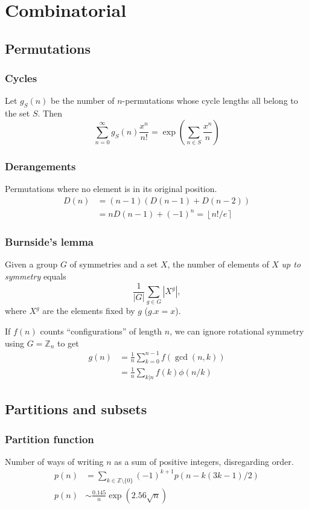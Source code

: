 
\vspace{5pt}
\chapter{Combinatorial}

\section{Permutations}
	\subsection{Cycles}
		Let $g_S(n)$ be the number of $n$-permutations whose cycle lengths all belong to the set $S$. Then
		$$\sum_{n=0} ^\infty g_S(n) \frac{x^n}{n!} = \exp\left(\sum_{n\in S} \frac{x^n} {n} \right)$$

\subsection{Derangements}
Permutations where no element is in its original position.
\[
\begin{aligned}
  D(n) &= (n-1)(D(n-1)+D(n-2)) \\
       &= n D(n-1)+(-1)^n = \left\lfloor n!/e \right\rceil
\end{aligned}
\]

	\subsection{Burnside's lemma}
		Given a group $G$ of symmetries and a set $X$, the number of elements of $X$ \emph{up to symmetry} equals
		 \[ {\frac {1}{|G|}}\sum _{{g\in G}}|X^{g}|, \]
		 where $X^{g}$ are the elements fixed by $g$ ($g.x = x$).

    If $f(n)$ counts ``configurations'' of length $n$, we can ignore rotational symmetry using $G = \mathbb Z_n$ to get
    \[
    \begin{aligned}
      g(n) &= \frac{1}{n} \sum_{k=0}^{n-1}{f(\gcd(n, k))} \\
          &= \frac{1}{n} \sum_{k|n}{f(k)\phi(n/k)}
    \end{aligned}
    \]

\section{Partitions and subsets}
\subsection{Partition function}
Number of ways of writing $n$ as a sum of positive integers, disregarding order.
\[
\begin{aligned}
  p(n) &= \sum_{k \in \mathbb Z \setminus \{0\}}{(-1)^{k+1} p(n - k(3k-1) / 2)} \\
  p(n) &\sim \frac{0.145}{n} \exp(2.56 \sqrt{n})
\end{aligned}
\]

